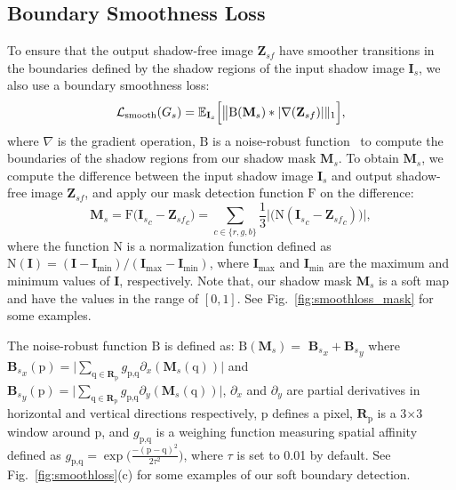 \documentclass[10pt,twocolumn,letterpaper]{article}
\begin{document}
\subsection{Boundary Smoothness Loss}
To ensure that the output shadow-free image $\mathbf{Z}_{sf}$ have smoother transitions in the boundaries defined by the shadow regions of the input shadow image $\mathbf{I}_s$, we also use a boundary smoothness loss:
\begin{equation}
\mathcal{L}_{\rm smooth}(G_s) =
	\mathbb{E}_{\mathbf{I}_s}\Big[\big\lVert \text{B}(\mathbf{M}_s) *
	|\nabla(\mathbf{Z}_{sf})|\rVert_1\Big], 
	\label{eqn_smooth}
\end{equation}
where $\nabla$ is the gradient operation, $\text{B}$ is a noise-robust function~\cite{xu2012structure, sharma2018into, yan2020nighttime} to compute the boundaries of the shadow regions from our shadow mask $\mathbf{M}_s$. 
To obtain $\mathbf{M}_s$, we compute the difference between the input shadow image $\mathbf{I}_s$ and output shadow-free image $\mathbf{Z}_{sf}$, and apply our mask detection function $\text{F}$ on the difference:
\begin{equation}
\mathbf{M}_s = \text{F}\bigl({\mathbf{I}_s}_c - {\mathbf{Z}_{sf}}_c\bigr)\!=\! 
\sum_{c\in\{r,g,b\}}\frac{1}{3}\Big\lvert\bigl(\text{N}({\mathbf{I}_s}_c - {\mathbf{Z}_{sf}}_c)\bigr)\Big\rvert,
\label{eq:mask}
\end{equation}
where the function $\text{N}$ is a normalization function defined as $\text{N}(\mathbf{I}) = (\mathbf{I}- \mathbf{I}_\text{min})/(\mathbf{I}_\text{max} - \mathbf{I}_\text{min})$, where $\mathbf{I}_\text{max}$ and $\mathbf{I}_\text{min}$ are the maximum and minimum values of $\mathbf{I}$, respectively. Note that, our shadow mask $\mathbf{M}_s$ is a soft map and have the values in the range of $[0, 1]$. See Fig.~\ref{fig:smoothloss_mask} for some examples. 

The noise-robust function $\text{B}$ is defined as: $\text{B}(\mathbf{M}_s) =$ ${\mathbf{B}_{s}}_x + {\mathbf{B}_{s}}_y$ where ${\mathbf{B}_{s}}_x(\text{p}) = \big\lvert\sum_{\text{q}\in \mathbf{R}_\text{p}}g_{\text{p},\text{q}}\partial_x(\mathbf{M}_s(\text{q}))\big\rvert$ and 
${\mathbf{B}_{s}}_y(\text{p}) = \big\lvert\sum_{\text{q}\in \mathbf{R}_\text{p}}g_{\text{p},\text{q}}\partial_y(\mathbf{M}_s(\text{q}))\big\rvert$,  $\partial_x$ and $\partial_y$ are partial derivatives in horizontal and vertical directions respectively, $\text{p}$ defines a pixel, $\mathbf{R}_\text{p}$ is a 3$\times$3 window around $\text{p}$, and $g_{\text{p},\text{q}}$ is a weighing function measuring spatial affinity defined as $g_{\text{p},\text{q}}=\exp\big(\frac{-(\text{p}-\text{q})^2}{2\tau^2}\big)$, where $\tau$ is set to 0.01 by default. See Fig.~\ref{fig:smoothloss}(c) for some examples of our soft boundary detection. 
\end{document}
